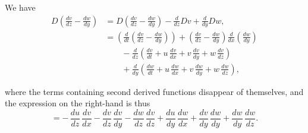 \documentclass[11pt,a4paper]{article}
\begin{document}
We have
\begin{align*}
D\!\left(\frac{dv}{dz} - \frac{dw}{dy}\right) &= D\!\left(\frac{dv}{dz} - \frac{dw}{dy}\right) - \frac{d}{dz}Dv + \frac{d}{dy}Dw,\\
&= \left(\frac{d}{dt}\!\left(\frac{dv}{dz} - \frac{dw}{dy}\right)\right) + \left(\frac{dv}{dz} - \frac{dw}{dy}\right)\!\frac{d}{dx}\!\left(\frac{dw}{dy}\right)\\
&\qquad - \frac{d}{dz}\!\left(\frac{dv}{dt} + u\,\frac{dv}{dx} + v\,\frac{dv}{dy} + w\,\frac{dv}{dz}\right)\\
&\qquad + \frac{d}{dy}\!\left(\frac{dw}{dt} + u\,\frac{dw}{dx} + v\,\frac{dw}{dy} + w\,\frac{dw}{dz}\right),
\end{align*}

\newpage

where the terms containing second derived functions disappear of themselves, and the expression on the right-hand is thus
\[
= -\,\frac{du}{dz}\,\frac{dv}{dx} - \frac{dv}{dz}\,\frac{dv}{dy} - \frac{dw}{dz}\,\frac{dv}{dz}
+ \frac{du}{dy}\,\frac{dw}{dx} + \frac{dv}{dy}\,\frac{dw}{dy} + \frac{dw}{dy}\,\frac{dw}{dz}.
\]
\end{document}
